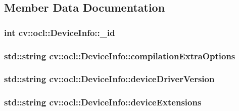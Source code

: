 \subsection{Member Data Documentation}
\hypertarget{structcv_1_1ocl_1_1DeviceInfo_ada03ba0f71aa2c5d7e118e487734bd42}{
\subsubsection[{\-\_\-id}]{\setlength{\rightskip}{0pt plus 5cm}int cv\-::ocl\-::\-Device\-Info\-::\-\_\-id}}\label{structcv_1_1ocl_1_1DeviceInfo_ada03ba0f71aa2c5d7e118e487734bd42}
\hypertarget{structcv_1_1ocl_1_1DeviceInfo_af7cf18452bf2e0dd138c88d7a156113d}{
\subsubsection[{compilation\-Extra\-Options}]{\setlength{\rightskip}{0pt plus 5cm}std\-::string cv\-::ocl\-::\-Device\-Info\-::compilation\-Extra\-Options}}\label{structcv_1_1ocl_1_1DeviceInfo_af7cf18452bf2e0dd138c88d7a156113d}
\hypertarget{structcv_1_1ocl_1_1DeviceInfo_a05b7822c3e55db9455e4cbfdab1d88f4}{
\subsubsection[{device\-Driver\-Version}]{\setlength{\rightskip}{0pt plus 5cm}std\-::string cv\-::ocl\-::\-Device\-Info\-::device\-Driver\-Version}}\label{structcv_1_1ocl_1_1DeviceInfo_a05b7822c3e55db9455e4cbfdab1d88f4}
\hypertarget{structcv_1_1ocl_1_1DeviceInfo_a274f78ac33e46288975b1f6f3d53c62c}{
\subsubsection[{device\-Extensions}]{\setlength{\rightskip}{0pt plus 5cm}std\-::string cv\-::ocl\-::\-Device\-Info\-::device\-Extensions}}\label{structcv_1_1ocl_1_1DeviceInfo_a274f78ac33e46288975b1f6f3d53c62c}
